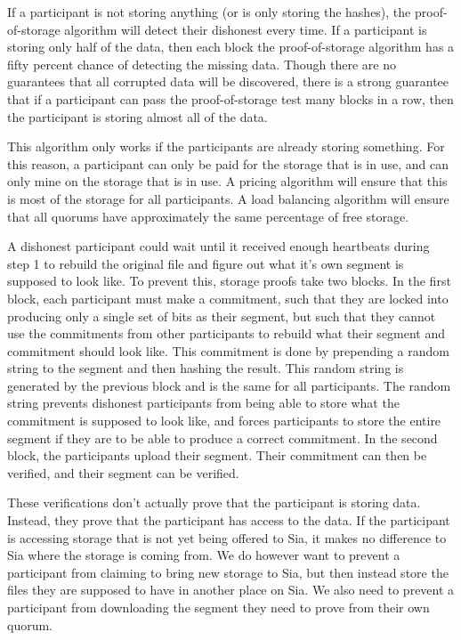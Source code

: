 \documentclass[twocolumn]{article}
\begin{document}
If a participant is not storing anything (or is only storing the hashes), the proof-of-storage algorithm will detect their dishonest every time.
If a participant is storing only half of the data, then each block the proof-of-storage algorithm has a fifty percent chance of detecting the missing data.
Though there are no guarantees that all corrupted data will be discovered, there is a strong guarantee that if a participant can pass the proof-of-storage test many blocks in a row, then the participant is storing almost all of the data.

This algorithm only works if the participants are already storing something.
For this reason, a participant can only be paid for the storage that is in use, and can only mine on the storage that is in use.
A pricing algorithm will ensure that this is most of the storage for all participants.
A load balancing algorithm will ensure that all quorums have approximately the same percentage of free storage.

A dishonest participant could wait until it received enough heartbeats during step 1 to rebuild the original file and figure out what it's own segment is supposed to look like.
To prevent this, storage proofs take two blocks.
In the first block, each participant must make a commitment, such that they are locked into producing only a single set of bits as their segment, but such that they cannot use the commitments from other participants to rebuild what their segment and commitment should look like.
This commitment is done by prepending a random string to the segment and then hashing the result.
This random string is generated by the previous block and is the same for all participants.
The random string prevents dishonest participants from being able to store what the commitment is supposed to look like, and forces participants to store the entire segment if they are to be able to produce a correct commitment.
In the second block, the participants upload their segment.
Their commitment can then be verified, and their segment can be verified.

These verifications don't actually prove that the participant is storing data.
Instead, they prove that the participant has access to the data.
If the participant is accessing storage that is not yet being offered to Sia, it makes no difference to Sia where the storage is coming from.
We do however want to prevent a participant from claiming to bring new storage to Sia, but then instead store the files they are supposed to have in another place on Sia.
We also need to prevent a participant from downloading the segment they need to prove from their own quorum.
\end{document}
